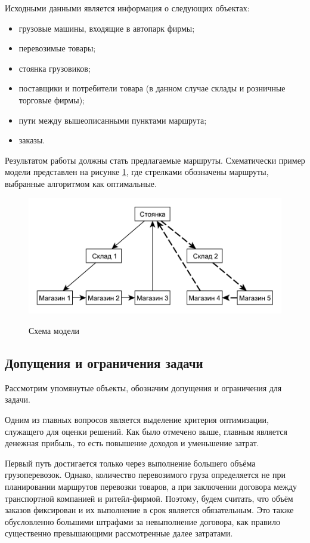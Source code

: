 	Исходными данными является информация о следующих объектах:
	\begin{itemize}
		\item грузовые машины, входящие в автопарк фирмы;
		\item перевозимые товары;
		\item стоянка грузовиков;
		\item поставщики и потребители товара (в данном случае склады и розничные торговые фирмы);
		\item пути между вышеописанными пунктами маршрута;
		\item заказы.
	\end{itemize}

	Результатом работы должны стать предлагаемые маршруты. Схематически пример модели представлен на рисунке \ref{pic:model}, где стрелками обозначены маршруты, выбранные алгоритмом как оптимальные.
	
	\begin{figure}[h!] 
		\begin{center}
			{\includegraphics[scale=0.9, angle=0]{img/model.pdf}}
			\caption{Схема модели}
			\label{pic:model}
		\end{center}
	\end{figure}
	
	\subsection{Допущения и ограничения задачи}
	Рассмотрим упомянутые объекты, обозначим допущения и ограничения для задачи.
	
	Одним из главных вопросов является выделение критерия оптимизации, служащего для оценки решений. Как было отмечено выше, главным является денежная прибыль, то есть повышение доходов и уменьшение затрат.   
	
	Первый путь достигается только через выполнение большего объёма грузоперевозок. Однако, количество перевозимого груза определяется не при планировании маршрутов перевозки товаров, а при заключении договора между транспортной компанией и ритейл-фирмой. Поэтому, будем считать, что объём заказов фиксирован и их выполнение в срок является обязательным. Это также обусловленно большими штрафами за невыполнение договора, как правило существенно превышающими рассмотренные далее затратами.
	
